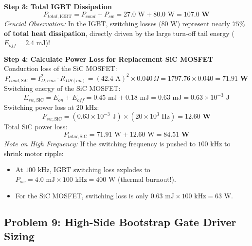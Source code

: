 \documentclass[11pt,a4paper]{article}
\begin{document}
\begin{examplebox}
\textbf{Step 3: Total IGBT Dissipation}
\begin{equation}
P_{total,\text{IGBT}} = P_{cond} + P_{sw} = 27.0\text{ W} + 80.0\text{ W} = \mathbf{107.0\text{ W}}
\end{equation}
\textit{Crucial Observation:} In the IGBT, switching losses ($80\text{ W}$) represent nearly \textbf{$75\%$ of total heat dissipation}, directly driven by the large turn-off tail energy ($E_{off} = 2.4\text{ mJ}$)!

\textbf{Step 4: Calculate Power Loss for Replacement SiC MOSFET}
Conduction loss of the SiC MOSFET:
\begin{equation}
P_{cond,\text{SiC}} = I_{D,rms}^2 \cdot R_{DS(on)} = (42.4\text{ A})^2 \times 0.040\,\Omega = 1797.76 \times 0.040 = \mathbf{71.91\text{ W}}
\end{equation}
Switching energy of the SiC MOSFET:
\begin{equation}
E_{sw,\text{SiC}} = E_{on} + E_{off} = 0.45\text{ mJ} + 0.18\text{ mJ} = 0.63\text{ mJ} = 0.63 \times 10^{-3}\text{ J}
\end{equation}
Switching power loss at $20\text{ kHz}$:
\begin{equation}
P_{sw,\text{SiC}} = (0.63 \times 10^{-3}\text{ J}) \times (20 \times 10^3\text{ Hz}) = \mathbf{12.60\text{ W}}
\end{equation}
Total SiC power loss:
\begin{equation}
P_{total,\text{SiC}} = 71.91\text{ W} + 12.60\text{ W} = \mathbf{84.51\text{ W}}
\end{equation}
\textit{Note on High Frequency:} If the switching frequency is pushed to $100\text{ kHz}$ to shrink motor ripple:
\begin{itemize}[leftmargin=*]
  \item At $100\text{ kHz}$, IGBT switching loss explodes to $P_{sw} = 4.0\text{ mJ} \times 100\text{ kHz} = 400\text{ W}$ (thermal burnout!).
  \item For the SiC MOSFET, switching loss is only $0.63\text{ mJ} \times 100\text{ kHz} = 63\text{ W}$.
\end{itemize}
\end{examplebox}

\subsection{Problem 9: High-Side Bootstrap Gate Driver Sizing}
\end{document}
